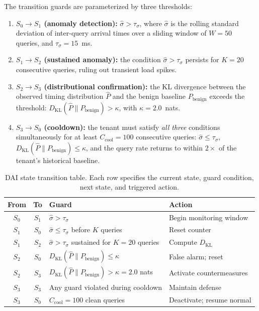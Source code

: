 \documentclass[11pt]{article}
\begin{document}
\noindent The transition guards are parameterized by three thresholds:

\begin{enumerate}[leftmargin=1.5em,itemsep=2pt]
    \item \textbf{$S_0 \to S_1$ (anomaly detection):} $\hat{\sigma} > \tau_\sigma$, where
          $\hat{\sigma}$ is the rolling standard deviation of inter-query arrival times
          over a sliding window of $W = 50$ queries, and $\tau_\sigma = 15$~ms.
    \item \textbf{$S_1 \to S_2$ (sustained anomaly):} the condition $\hat{\sigma} > \tau_\sigma$
          persists for $K = 20$ consecutive queries, ruling out transient load spikes.
    \item \textbf{$S_2 \to S_3$ (distributional confirmation):} the KL divergence between
          the observed timing distribution $\hat{P}$ and the benign baseline $P_{\mathrm{benign}}$
          exceeds the threshold:
          $D_{\mathrm{KL}}(\hat{P} \| P_{\mathrm{benign}}) > \kappa$, with $\kappa = 2.0$~nats.
    \item \textbf{$S_3 \to S_0$ (cooldown):} the tenant must satisfy \emph{all three}
          conditions simultaneously for at least $C_{\mathrm{cool}} = 100$ consecutive
          queries: $\hat{\sigma} \leq \tau_\sigma$, $D_{\mathrm{KL}}(\hat{P} \| P_{\mathrm{benign}}) \leq \kappa$,
          and the query rate returns to within $2\times$ of the tenant's historical baseline.
\end{enumerate}

\begin{table}[t]
\centering
\caption{DAI state transition table. Each row specifies the current state, guard condition,
next state, and triggered action.}
\label{tab:dfa-transitions}
\small
\begin{tabular}{@{}ccll@{}}
\toprule
\textbf{From} & \textbf{To} & \textbf{Guard} & \textbf{Action} \\
\midrule
$S_0$ & $S_1$ & $\hat{\sigma} > \tau_\sigma$ & Begin monitoring window \\
$S_1$ & $S_0$ & $\hat{\sigma} \leq \tau_\sigma$ before $K$ queries & Reset counter \\
$S_1$ & $S_2$ & $\hat{\sigma} > \tau_\sigma$ sustained for $K = 20$ queries & Compute $D_{\mathrm{KL}}$ \\
$S_2$ & $S_0$ & $D_{\mathrm{KL}}(\hat{P} \| P_{\mathrm{benign}}) \leq \kappa$ & False alarm; reset \\
$S_2$ & $S_3$ & $D_{\mathrm{KL}}(\hat{P} \| P_{\mathrm{benign}}) > \kappa = 2.0$ nats & Activate countermeasures \\
$S_3$ & $S_3$ & Any guard violated during cooldown & Maintain defense \\
$S_3$ & $S_0$ & $C_{\mathrm{cool}} = 100$ clean queries & Deactivate; resume normal \\
\bottomrule
\end{tabular}
\end{table}
\end{document}
